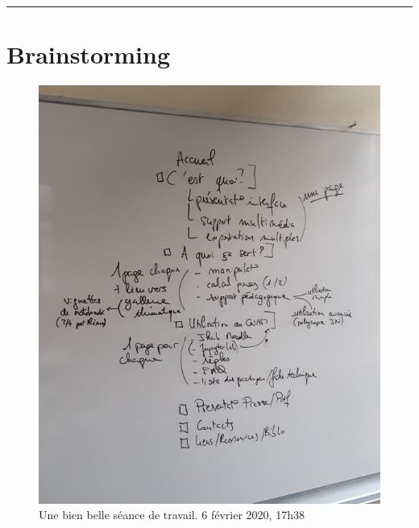 \documentclass[a4paper, 12pt]{article}
\begin{document}
\begin{center}
\rule{.5\textwidth}{1pt}
\end{center}
\section*{Brainstorming}

\begin{figure}[!ht]
  \centering
  \includegraphics[width=.4\textwidth]{brainstorm.jpg}
  \caption{Une bien belle séance de travail. 6 février 2020, 17h38}
\end{figure}
\end{document}
